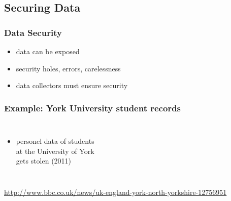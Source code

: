 \documentclass[dvipsnames]{beamer}
\theoremstyle{plain}
\begin{document}
\subsection{Securing Data}

\begin{frame}
  \frametitle{Data Security}

  \begin{itemize}
    \item data can be exposed
    \item security holes, errors, carelessness

    \bigskip
    \item data collectors must ensure security
  \end{itemize}
\end{frame}

\begin{frame}
  \frametitle{Example: York University student records}

  \begin{columns}

    \begin{itemize}
      \item personel data of students\\
        at the University of York\\
        gets stolen (2011)
    \end{itemize}
  \end{columns}

  \medskip
  \tiny{\url{http://www.bbc.co.uk/news/uk-england-york-north-yorkshire-12756951}}\\
\end{frame}
\end{document}
